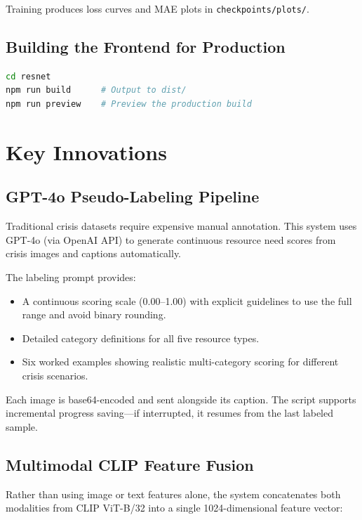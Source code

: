 \documentclass[11pt,a4paper]{article}
\begin{document}
Training produces loss curves and MAE plots in \texttt{checkpoints/plots/}.

\subsection{Building the Frontend for Production}

\begin{lstlisting}[language=bash]
cd resnet
npm run build      # Output to dist/
npm run preview    # Preview the production build
\end{lstlisting}

\newpage
\section{Key Innovations}

\subsection{GPT-4o Pseudo-Labeling Pipeline}

Traditional crisis datasets require expensive manual annotation. This system uses GPT-4o (via OpenAI API) to generate continuous resource need scores from crisis images and captions automatically.

The labeling prompt provides:
\begin{itemize}
    \item A continuous scoring scale (0.00--1.00) with explicit guidelines to use the full range and avoid binary rounding.
    \item Detailed category definitions for all five resource types.
    \item Six worked examples showing realistic multi-category scoring for different crisis scenarios.
\end{itemize}

Each image is base64-encoded and sent alongside its caption. The script supports incremental progress saving---if interrupted, it resumes from the last labeled sample.

\subsection{Multimodal CLIP Feature Fusion}

Rather than using image or text features alone, the system concatenates both modalities from CLIP ViT-B/32 into a single 1024-dimensional feature vector:
\end{document}
